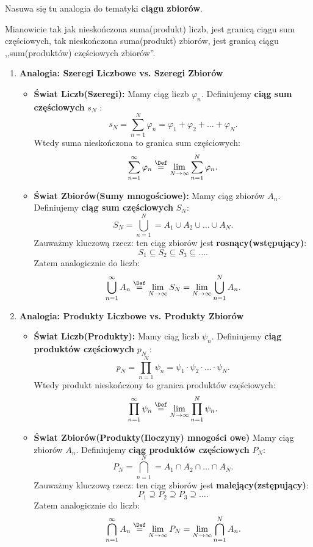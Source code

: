 Nasuwa się tu analogia do tematyki \textbf{ciągu zbiorów}.

Mianowicie tak jak nieskończona suma(produkt) liczb, jest granicą ciągu sum częściowych, tak nieskończona suma(produkt) zbiorów, jest granicą ciągu ,,sum(produktów) częściowych zbiorów''.

\begin{enumerate}[label=\arabic*.]
	\item \textbf{Analogia: Szeregi Liczbowe vs. Szeregi Zbiorów} 
		\begin{itemize}
				\item \textbf{Świat Liczb(Szeregi):} Mamy ciąg liczb $\varphi_{n}$. Definiujemy \textbf{ciąg sum częściowych} $s_{N}$ :
			\[
			s_{N} = \sum_{n = 1}^{N} \varphi_{n} = \varphi_1 + \varphi_2 + \ldots + \varphi_{N}
			.\] 
			Wtedy suma nieskończona to granica sum częściowych:
			\[
			\sum_{n = 1}^{\infty} \varphi_{n} \overset{\Def}{=} \lim_{N\to \infty}\sum_{n = 1}^{N} \varphi_{n} 
			.\] 
				\item \textbf{Świat Zbiorów(Sumy mnogościowe):} Mamy ciąg zbiorów $A_{n}$. Definiujemy \textbf{ciąg sum częściowych} $S_{N}:$
			\[
			S_{N} = \bigcup_{n=1} ^{N} = A_1\cup A_2\cup \ldots\cup A_{N}
			.\] 
			Zauważmy kluczową rzecz: ten ciąg zbiorów jest \textbf{rosnący(wstępujący)}:
			\[
			S_1\subseteq S_2\subseteq S_3\subseteq \ldots
			.\] 
			Zatem analogicznie do liczb:
			\[
			\bigcup_{n=1} ^{\infty}A_{n} \overset{\Def}{=} \lim_{N \to \infty} S_{N} = \lim_{N \to \infty} \bigcup_{n=1} ^{N}A_{n}
			.\] 
		\end{itemize}
	\item \textbf{Analogia: Produkty Liczbowe vs. Produkty Zbiorów} 
		\begin{itemize}
			\item \textbf{Świat Liczb(Produkty):} Mamy ciąg liczb $\psi_{n}$. Definiujemy \textbf{ciąg produktów częściowych} $p_{N}$ :
			\[
			p_{N} = \prod_{n = 1}^{N} \psi_{n} = \psi_1 \cdot  \psi_2 \cdot  \ldots \cdot  \psi_{N}
			.\] 
			Wtedy produkt nieskończony to granica produktów częściowych:
			\[
			\prod_{n = 1}^{\infty} \psi_{n} \overset{\Def}{=} \lim_{N\to \infty}\prod_{n = 1}^{N} \psi_{n} 
			.\] 
				\item \textbf{Świat Zbiorów(Produkty(Iloczyny) mnogości owe)} Mamy ciąg zbiorów $A_{n}$. Definiujemy \textbf{ciąg produktów częściowych} $P_{N}:$
			\[
			P_{N} = \bigcap_{n=1} ^{N} = A_1\cap A_2\cap \ldots\cap A_{N}
			.\] 
			Zauważmy kluczową rzecz: ten ciąg zbiorów jest \textbf{malejący(zstępujący)}:
			\[
			P_1\supseteq P_2\supseteq P_3\supseteq \ldots
			.\] 
			Zatem analogicznie do liczb:
			\[
			\bigcap_{n=1} ^{\infty}A_{n} \overset{\Def}{=} \lim_{N \to \infty} P_{N} = \lim_{N \to \infty} \bigcap_{n=1} ^{N}A_{n}
			.\] 
 
		\end{itemize}

\end{enumerate}
